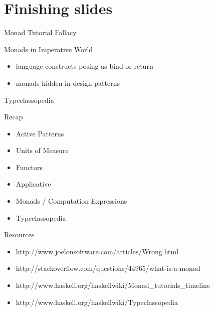\documentclass{beamer}
\begin{document}
\section{Finishing slides}
\frame{\tableofcontents[currentsection]}

\begin{frame}{Monad Tutorial Fallacy}
  \center
\end{frame}

\begin{frame}{Monads in Imperative World}
  \begin{itemize}[<+->]
    \item language constructs posing as bind or return
    \item monads hidden in design patterns
  \end{itemize}
\end{frame}

\begin{frame}{Typeclassopedia}
  \center
\end{frame}

\begin{frame}{Recap}
  \begin{itemize}[<+->]
    \item Active Patterns
    \item Units of Measure
    \item Functors
    \item Applicative
    \item Monads / Computation Expressions
    \item Typeclassopedia
  \end{itemize}
\end{frame}

\begin{frame}{Resources}
  \begin{itemize}
    \item http://www.joelonsoftware.com/articles/Wrong.html
    \item http://stackoverflow.com/questions/44965/what-is-a-monad
    \item http://www.haskell.org/haskellwiki/Monad\_tutorials\_timeline
    \item http://www.haskell.org/haskellwiki/Typeclassopedia
  \end{itemize}
\end{frame}
\end{document}
